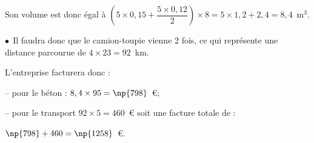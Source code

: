 \begin{enumerate}
Son volume est donc égal à $\left(5 \times 0,15 + \dfrac{5 \times 0,12}{2}\right) \times 8 = 5 \times 1,2 + 2,4 = 8,4$~m$^3$.

$\bullet~~$Il faudra donc que le camion-toupie vienne 2 fois, ce qui représente une distance parcourue de $4 \times 23 = 92$~km.

L'entreprise facturera donc :

-- pour le béton : $8,4 \times 95 = \np{798}$~\euro ;

-- pour le transport $92 \times 5 = 460$~\euro{} soit une facture totale de :

$\np{798} + 460 = \np{1258}$~\euro.

\end{enumerate}

\vspace{0,5cm}

